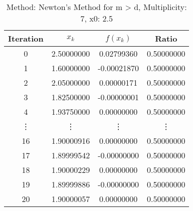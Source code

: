 \begin{table}
\centering
\caption{Method: Newton's Method for m > d, Multiplicity: 7, x0: 2.5}
\label{tab:table_Newton's_Method_for_m_>_d_7_2_5}
\begin{tabular}{c c c c}
\toprule
Iteration &      $x_k$ &    $f(x_k)$ &      Ratio \\
\midrule
        0 & 2.50000000 &  0.02799360 & 0.50000000 \\
        1 & 1.60000000 & -0.00021870 & 0.50000000 \\
        2 & 2.05000000 &  0.00000171 & 0.50000000 \\
        3 & 1.82500000 & -0.00000001 & 0.50000000 \\
        4 & 1.93750000 &  0.00000000 & 0.50000000 \\
   \vdots &     \vdots &      \vdots &     \vdots \\
       16 & 1.90000916 &  0.00000000 & 0.50000000 \\
       17 & 1.89999542 & -0.00000000 & 0.50000000 \\
       18 & 1.90000229 &  0.00000000 & 0.50000000 \\
       19 & 1.89999886 & -0.00000000 & 0.50000000 \\
       20 & 1.90000057 &  0.00000000 & 0.50000000 \\
\bottomrule
\end{tabular}
\end{table}
